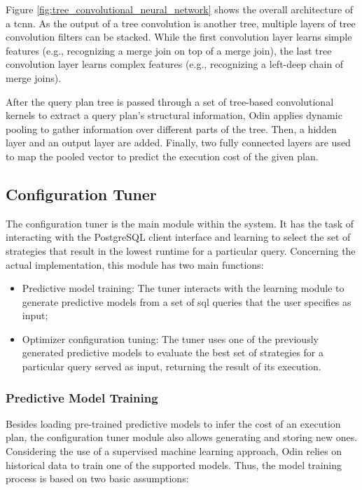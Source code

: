 Figure \ref{fig:tree_convolutional_neural_network} shows the overall architecture of a \gls{tcnn}. As the output of a tree convolution is another tree, multiple layers of tree convolution filters can be stacked. While the first convolution layer learns simple features (e.g., recognizing a merge join on top of a merge join), the last tree convolution layer learns complex features (e.g., recognizing a left-deep chain of merge joins).

After the query plan tree is passed through a set of tree-based convolutional kernels to extract a query plan's structural information, Odin applies dynamic pooling to gather information over different parts of the tree. Then, a hidden layer and an output layer are added. Finally, two fully connected layers are used to map the pooled vector to predict the execution cost of the given plan.

\subsection{Configuration Tuner}

The configuration tuner is the main module within the system. It has the task of interacting with the PostgreSQL client interface and learning to select the set of strategies that result in the lowest runtime for a particular query. Concerning the actual implementation, this module has two main functions:

\begin{itemize}
    \item Predictive model training: The tuner interacts with the learning module to generate predictive models from a set of \gls{sql} queries that the user specifies as input;
    \item Optimizer configuration tuning: The tuner uses one of the previously generated predictive models to evaluate the best set of strategies for a particular query served as input, returning the result of its execution.
\end{itemize}

\subsubsection{Predictive Model Training}

Besides loading pre-trained predictive models to infer the cost of an execution plan, the configuration tuner module also allows generating and storing new ones. Considering the use of a supervised machine learning approach, Odin relies on historical data to train one of the supported models. Thus, the model training process is based on two basic assumptions:

